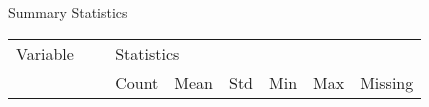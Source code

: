 \begin{threeparttable}
    \caption{Summary Statistics} %
\label{tab:summarystats} %
    \begin{tabular}{ p{0.34\linewidth} p{0.08\linewidth} p{0.08\linewidth} p{0.08\linewidth} p{0.08\linewidth} p{0.08\linewidth} p{0.08\linewidth}}     %
    \toprule %
    Variable                        & \multicolumn{6}{l}{Statistics} \\ %

                       \cmidrule(r){2-7} %
                                    &    Count   &   Mean & Std & Min & Max & Missing  \\ 
\midrule 


\end{tabular}
\end{threeparttable}

